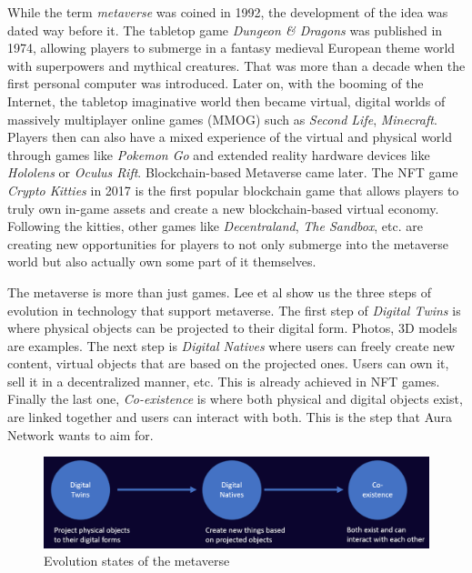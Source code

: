 \documentclass[12pt]{article}
\begin{document}
While the term \emph{metaverse} was coined in 1992, the development of the idea was dated way before it. The tabletop game \emph{Dungeon \& Dragons} was published in 1974, allowing players to submerge in a fantasy medieval European theme world with superpowers and mythical creatures. That was more than a decade when the first personal computer was introduced. Later on, with the booming of the Internet, the tabletop imaginative world then became virtual, digital worlds of massively multiplayer online games (MMOG) such as \emph{Second Life}, \emph{Minecraft}. Players then can also have a mixed experience of the virtual and physical world through games like \emph{Pokemon Go} and extended reality hardware devices like \emph{Hololens} or \emph{Oculus Rift}. Blockchain-based Metaverse came later. The NFT game \emph{Crypto Kitties} in 2017 is the first popular blockchain game that allows players to truly own in-game assets and create a new blockchain-based virtual economy. Following the kitties, other games like \emph{Decentraland}, \emph{The Sandbox}, etc. are creating new opportunities for players to not only submerge into the metaverse world but also actually own some part of it themselves.

The metaverse is more than just games. Lee et al \cite{lee2021all} show us the three steps of evolution in technology that support metaverse. The first step of \emph{Digital Twins} is where physical objects can be projected to their digital form. Photos, 3D models are examples. The next step is \emph{Digital Natives} where users can freely create new content, virtual objects that are based on the projected ones. Users can own it, sell it in a decentralized manner, etc. This is already achieved in NFT games. Finally the last one, \emph{Co-existence} is where both physical and digital objects exist, are linked together and users can interact with both. This is the step that Aura Network wants to aim for.   

\begin{figure}[ht]
\label{fig:metaverse}
\includegraphics[width=14cm]{img/metaverse.png}
\centering
\caption{Evolution states of the metaverse \cite{lee2021all}}
\end{figure}
\end{document}
